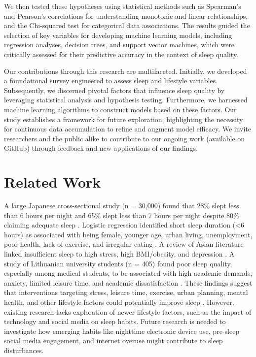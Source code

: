 \documentclass[conference]{IEEEtran}
\begin{document}
We then tested these hypotheses using statistical methods such as Spearman's and Pearson's correlations for understanding monotonic and linear relationships, and the Chi-squared test for categorical data associations. The results guided the selection of key variables for developing machine learning models, including regression analyses, decision trees, and support vector machines, which were critically assessed for their predictive accuracy in the context of sleep quality.

Our contributions through this research are multifaceted. Initially, we developed a foundational survey engineered to assess sleep and lifestyle variables. Subsequently, we discerned pivotal factors that influence sleep quality by leveraging statistical analysis and hypothesis testing. Furthermore, we harnessed machine learning algorithms to construct models based on these factors. Our study establishes a framework for future exploration, highlighting the necessity for continuous data accumulation to refine and augment model efficacy. We invite researchers and the public alike to contribute to our ongoing work (available on GitHub\footnotemark) through feedback and new applications of our findings.



\section{Related Work}
A large Japanese cross-sectional study (n = 30,000) found that 28\% slept less than 6 hours per night and 65\% slept less than 7 hours per night despite 80\% claiming adequate sleep \cite{lifestyleinfluence}. Logistic regression identified short sleep duration (\textless 6 hours) as associated with being female, younger age, urban living, unemployment, poor health, lack of exercise, and irregular eating \cite{lifestyleinfluence}. A review of Asian literature linked insufficient sleep to high stress, high BMI/obesity, and depression \cite{immune}. A study of Lithuanian university students (n = 405) found poor sleep quality, especially among medical students, to be associated with high academic demands, anxiety, limited leisure time, and academic dissatisfaction \cite{lithua}. These findings suggest that interventions targeting stress, leisure time, exercise, urban planning, mental health, and other lifestyle factors could potentially improve sleep \cite{lifestyleinfluence,lithua}. However, existing research lacks exploration of newer lifestyle factors, such as the impact of technology and social media on sleep habits. Future research is needed to investigate how emerging habits like nighttime electronic device use, pre-sleep social media engagement, and internet overuse might contribute to sleep disturbances.
\end{document}
